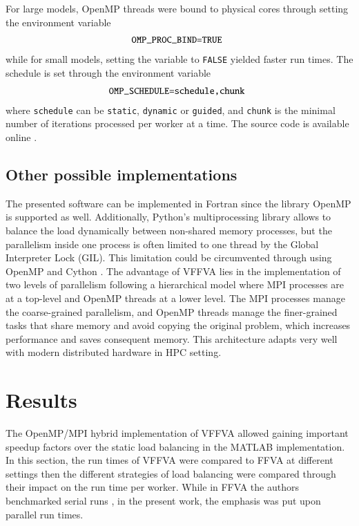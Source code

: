 For large models, OpenMP threads were bound to physical cores through setting the environment variable 
\begin{equation*} \label{eq:one}
\begin{array}{ll@{}ll}
\texttt{OMP\_PROC\_BIND=TRUE} &\\
\end{array}
\end{equation*}
while for small models, setting the variable to \texttt{FALSE}  yielded faster run times.
The schedule is set through the environment variable
\begin{equation*} \label{eq:one}
\begin{array}{ll@{}ll}
\texttt{OMP\_SCHEDULE=schedule,chunk} &\\
\end{array}
\end{equation*}
where \texttt{schedule} can be \texttt{static}, \texttt{dynamic} or \texttt{guided}, and \texttt{chunk} is the minimal number of iterations processed per worker at a time. The source code is available online \cite{marouen_2018_1442456}.
\subsection*{Other possible implementations}
The presented software can be implemented in Fortran since the library OpenMP is supported as well.
Additionally, Python's multiprocessing library allows to balance the load dynamically between non-shared memory processes, but the parallelism inside one process is often limited to one thread by the Global Interpreter Lock (GIL). This limitation could be circumvented through using OpenMP and Cython \cite{behnel2011cython}. The advantage of VFFVA lies in the implementation of two levels of parallelism following a hierarchical model where MPI processes are at a top-level and OpenMP threads at a lower level. The MPI processes manage the coarse-grained parallelism, and OpenMP threads manage the finer-grained tasks that share memory and avoid copying the original problem, which increases performance and saves consequent memory. This architecture adapts very well with modern distributed hardware in HPC setting.\\
\section*{Results}
The OpenMP/MPI hybrid implementation of VFFVA allowed gaining important speedup factors over the static load balancing in the MATLAB implementation. In this section, the run times of VFFVA were compared to FFVA at different settings then the different strategies of load balancing were compared through their impact on the run time per worker. While in FFVA the authors benchmarked serial runs \cite{gudmundsson2010computationally}, in the present work, the emphasis was put upon parallel run times.
